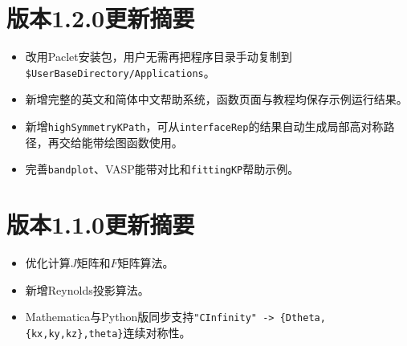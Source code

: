 \documentclass[titlepage,a4paper,12pt,AutoFakeBold]{article}
\begin{document}
\section{版本1.2.0更新摘要}

\begin{itemize}
\item 改用Paclet安装包，用户无需再把程序目录手动复制到\lstinline|$UserBaseDirectory/Applications|。
\item 新增完整的英文和简体中文帮助系统，函数页面与教程均保存示例运行结果。
\item 新增\lstinline|highSymmetryKPath|，可从\lstinline|interfaceRep|的结果自动生成局部高对称路径，再交给能带绘图函数使用。
\item 完善\lstinline|bandplot|、VASP能带对比和\lstinline|fittingKP|帮助示例。
\end{itemize}

\section{版本1.1.0更新摘要}

\begin{itemize}
\item 优化计算$J$矩阵和$F$矩阵算法。
\item 新增Reynolds投影算法。
\item Mathematica与Python版同步支持\lstinline|"CInfinity" -> {Dtheta,{kx,ky,kz},theta}|连续对称性。
\end{itemize}
\end{document}
